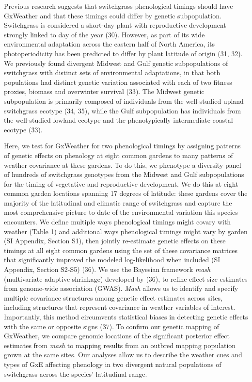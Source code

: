 \documentclass[
  9pt,
  twocolumn,
  twoside]{pnas-new}
\begin{document}
Previous research suggests that switchgrass phenological timings should
have GxWeather and that these timings could differ by genetic
subpopulation. Switchgrass is considered a short-day plant with
reproductive development strongly linked to day of the year (30).
However, as part of its wide environmental adaptation across the eastern
half of North America, its photoperiodicity has been predicted to differ
by plant latitude of origin (31, 32). We previously found divergent
Midwest and Gulf genetic subpopulations of switchgrass with distinct
sets of environmental adaptations, in that both populations had distinct
genetic variation associated with each of two fitness proxies, biomass
and overwinter survival (33). The Midwest genetic subpopulation is
primarily composed of individuals from the well-studied upland
switchgrass ecotype (34, 35), while the Gulf subpopulation has
individuals from the well-studied lowland ecotype and the phenotypically
intermediate coastal ecotype (33).

Here, we test for GxWeather for two phenological timings by assigning
patterns of genetic effects on phenology at eight common gardens to many
patterns of weather covariance at these gardens. To do this, we
phenotype a diversity panel of hundreds of switchgrass genotypes from
the Midwest and Gulf subpopulations for the timing of vegetative and
reproductive development. We do this at eight common garden locations
spanning 17 degrees of latitude: these gardens cover the majority of the
latitudinal and climatic range of switchgrass and capture the most
comprehensive picture to date of the environmental variation this
species encounters. We define multiple ways phenological timings might
covary with weather (Table 1) and additional ways phenological timings
might vary by garden (SI Appendix, Section S1), then jointly re-estimate
genetic effects on these timings at all eight common gardens using the
set of these covariance matrices that significantly improved the modeled
log-likelihood when included (SI Appendix, Section S2-S5) (36). We use
the Bayesian framework \emph{mash} (multivariate adaptive shrinkage)
developed by (36), to refine effect size estimates from genome-wide
association (GWAS). \emph{Mash} allows us to identify and specify
multiple covariance structures among genetic effect estimates across
sites, including structures that represent covariance in weather
variables of interest. Importantly, this method circumvents statistical
biases in detecting genetic effects with the same or opposite signs
(37). To confirm our genetic mapping of GxWeather, we compare genomic
locations of the significant posterior effect estimates from \emph{mash}
to mapping results from an outbred mapping population grown at the same
sites. Our analyses allow us to describe the weather cues and types of
GxE affecting phenology in two divergent natural populations of
switchgrass across the species' latitudinal range.
\end{document}
